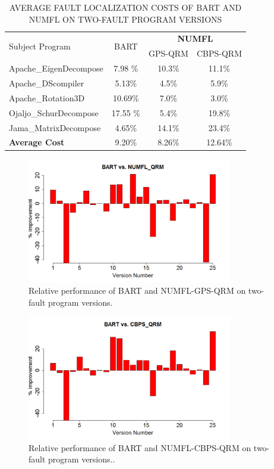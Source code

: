 \begin{table}[htbp!]
\caption{AVERAGE FAULT LOCALIZATION COSTS OF BART AND NUMFL ON TWO-FAULT PROGRAM VERSIONS}
\label{tableBARTvsNUMFL_M}
\centering
      \begin{tabular}{|l|c|c|c|}
      \hline
\multirow{2}{*}{Subject Program}	& \multirow{2}{*}{BART}&	\multicolumn{2}{|c|}{{\bf NUMFL}}	\\	\cline{3-4}
& & GPS-QRM	&CBPS-QRM \\ \hline
Apache\_EigenDecompose	&7.98	\%&10.3\%	&	11.1\%	\\	\hline
Apache\_DScompiler	&	5.13\%&4.5\%	&	5.9\%	\\	\hline
Apache\_Rotation3D	&	10.69\%&7.0\%	&	3.0\%	\\	\hline
Ojaljo\_SchurDecompose	&17.55	\%&5.4\%	&	19.8\%	\\	\hline
Jama\_MatrixDecompose	&	4.65\%&14.1\%	&	23.4\%	\\	\hline
{\bf Average Cost} &9.20\% &8.26\% &12.64\%\\ \hline
\end{tabular}
\end{table}

\begin{figure}[!thpb]
\centering
\includegraphics[width=0.8\textwidth]{chapter4_BARTvsGPS_QRM_M.pdf}
\caption{Relative performance of BART and NUMFL-GPS-QRM on two-fault program versions.}
\label{BARTvsGPS_M}
\end{figure}

\begin{figure}[!thpb]
\centering
\includegraphics[width=0.8\textwidth]{chapter4_BARTvsCBPS_M.pdf}
\caption{Relative performance of BART and NUMFL-CBPS-QRM on two-fault program versions..}
\label{BARTvsCBPS_M}
\end{figure}

